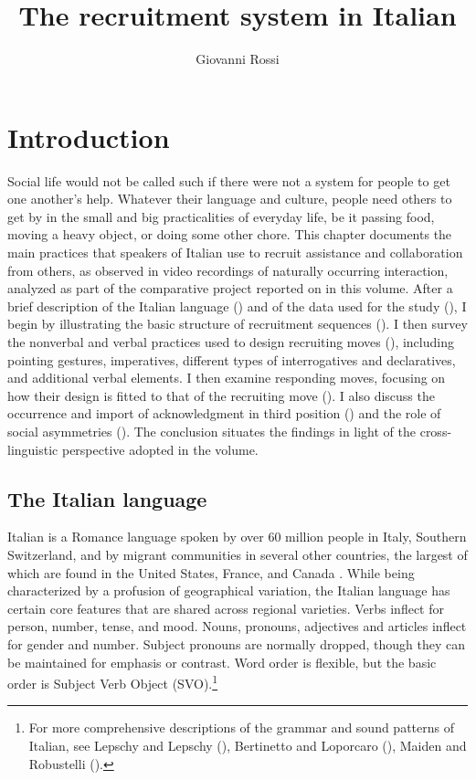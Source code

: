 \documentclass[output=paper,modfonts]{langscibook}
\title{The recruitment system in Italian}
\author{Giovanni Rossi\affiliation{Department of Sociology, University of California, Los Angeles}}
\begin{document}
\maketitle
\label{sec:rossi}

\section{Introduction}\label{sec:rossi:1}
Social life would not be called such if there were not a system for people to get one another's help. Whatever their language and culture, people need others to get by in the small and big practicalities of everyday life, be it passing food, moving a heavy object, or doing some other chore. This chapter documents the main practices that speakers of Italian use to recruit assistance and collaboration from others, as observed in video recordings of naturally occurring interaction, analyzed as part of the comparative project reported on in this volume. After a brief description of the Italian language () and of the data used for the study (), I begin by illustrating the basic structure of recruitment sequences (). I then survey the nonverbal and verbal practices used to design recruiting moves (), including pointing gestures, imperatives, different types of interrogatives and declaratives, and additional verbal elements. I then examine responding moves, focusing on how their design is fitted to that of the recruiting move (). I also discuss the occurrence and import of acknowledgment in third position () and the role of social asymmetries (). The conclusion situates the findings in light of the cross-linguistic perspective adopted in the volume.

\subsection{The Italian language}\label{sec:rossi:1.1}
Italian is a Romance language spoken by over 60 million people in Italy, Southern Switzerland, and by migrant communities in several other countries, the largest of which are found in the United States, France, and Canada \citep{LewisSimonsFennig2014}. While being characterized by a profusion of geographical variation, the Italian language has certain core features that are shared across regional varieties. Verbs inflect for person, number, tense, and mood. Nouns, pronouns, adjectives and articles inflect for gender and number. Subject pronouns are normally dropped, though they can be maintained for emphasis or contrast. Word order is flexible, but the basic order is Subject Verb Object (SVO).\footnote{For more comprehensive descriptions of the grammar and sound patterns of Italian, see Lepschy and Lepschy (\citeyear{LepschyLepschy1988}), Bertinetto and Loporcaro (\citeyear{BertinettoLoporcaro2005}), Maiden and Robustelli (\citeyear{MaidenRobustelli2007}).} 
\end{document}
